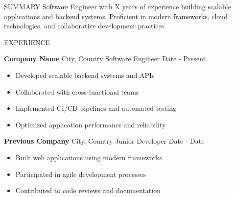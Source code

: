 \documentclass{resume} %
\begin{document}

\begin{rSection}{SUMMARY}
{Software Engineer with X years of experience building scalable applications and backend systems. Proficient in modern frameworks, cloud technologies, and collaborative development practices.}
\end{rSection}


\begin{rSection}{EXPERIENCE}

\textbf{Company Name} \hfill City, Country
Software Engineer \hfill Date - Present

 \begin{itemize}
    \itemsep -1pt {}
    \item Developed scalable backend systems and APIs
    \item Collaborated with cross-functional teams
    \item Implemented CI/CD pipelines and automated testing
    \item Optimized application performance and reliability
 \end{itemize}

\textbf{Previous Company} \hfill City, Country
Junior Developer \hfill Date - Date

 \begin{itemize}
    \itemsep -1pt {} 
    \item Built web applications using modern frameworks
    \item Participated in agile development processes
    \item Contributed to code reviews and documentation
 \end{itemize}

\end{rSection} 

\end{document}
